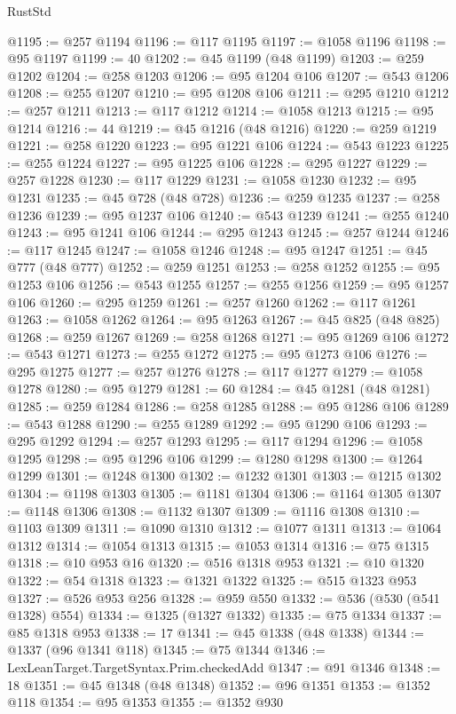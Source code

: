 \begin{lexlean}{RustStd}
\begin{coremodule}
@1195 := @257 @1194
@1196 := @117 @1195
@1197 := @1058 @1196
@1198 := @95 @1197
@1199 := 40
@1202 := @45 @1199 (@48 @1199)
@1203 := @259 @1202
@1204 := @258 @1203
@1206 := @95 @1204 @106
@1207 := @543 @1206
@1208 := @255 @1207
@1210 := @95 @1208 @106
@1211 := @295 @1210
@1212 := @257 @1211
@1213 := @117 @1212
@1214 := @1058 @1213
@1215 := @95 @1214
@1216 := 44
@1219 := @45 @1216 (@48 @1216)
@1220 := @259 @1219
@1221 := @258 @1220
@1223 := @95 @1221 @106
@1224 := @543 @1223
@1225 := @255 @1224
@1227 := @95 @1225 @106
@1228 := @295 @1227
@1229 := @257 @1228
@1230 := @117 @1229
@1231 := @1058 @1230
@1232 := @95 @1231
@1235 := @45 @728 (@48 @728)
@1236 := @259 @1235
@1237 := @258 @1236
@1239 := @95 @1237 @106
@1240 := @543 @1239
@1241 := @255 @1240
@1243 := @95 @1241 @106
@1244 := @295 @1243
@1245 := @257 @1244
@1246 := @117 @1245
@1247 := @1058 @1246
@1248 := @95 @1247
@1251 := @45 @777 (@48 @777)
@1252 := @259 @1251
@1253 := @258 @1252
@1255 := @95 @1253 @106
@1256 := @543 @1255
@1257 := @255 @1256
@1259 := @95 @1257 @106
@1260 := @295 @1259
@1261 := @257 @1260
@1262 := @117 @1261
@1263 := @1058 @1262
@1264 := @95 @1263
@1267 := @45 @825 (@48 @825)
@1268 := @259 @1267
@1269 := @258 @1268
@1271 := @95 @1269 @106
@1272 := @543 @1271
@1273 := @255 @1272
@1275 := @95 @1273 @106
@1276 := @295 @1275
@1277 := @257 @1276
@1278 := @117 @1277
@1279 := @1058 @1278
@1280 := @95 @1279
@1281 := 60
@1284 := @45 @1281 (@48 @1281)
@1285 := @259 @1284
@1286 := @258 @1285
@1288 := @95 @1286 @106
@1289 := @543 @1288
@1290 := @255 @1289
@1292 := @95 @1290 @106
@1293 := @295 @1292
@1294 := @257 @1293
@1295 := @117 @1294
@1296 := @1058 @1295
@1298 := @95 @1296 @106
@1299 := @1280 @1298
@1300 := @1264 @1299
@1301 := @1248 @1300
@1302 := @1232 @1301
@1303 := @1215 @1302
@1304 := @1198 @1303
@1305 := @1181 @1304
@1306 := @1164 @1305
@1307 := @1148 @1306
@1308 := @1132 @1307
@1309 := @1116 @1308
@1310 := @1103 @1309
@1311 := @1090 @1310
@1312 := @1077 @1311
@1313 := @1064 @1312
@1314 := @1054 @1313
@1315 := @1053 @1314
@1316 := @75 @1315
@1318 := @10 @953 @16
@1320 := @516 @1318 @953
@1321 := @10 @1320
@1322 := @54 @1318
@1323 := @1321 @1322
@1325 := @515 @1323 @953
@1327 := @526 @953 @256
@1328 := @959 @550
@1332 := @536 (@530 (@541 @1328) @554)
@1334 := @1325 (@1327 @1332)
@1335 := @75 @1334
@1337 := @85 @1318 @953
@1338 := 17
@1341 := @45 @1338 (@48 @1338)
@1344 := @1337 (@96 @1341 @118)
@1345 := @75 @1344
@1346 := LexLeanTarget.TargetSyntax.Prim.checkedAdd
@1347 := @91 @1346
@1348 := 18
@1351 := @45 @1348 (@48 @1348)
@1352 := @96 @1351
@1353 := @1352 @118
@1354 := @95 @1353
@1355 := @1352 @930

\end{coremodule}
\end{lexlean}
